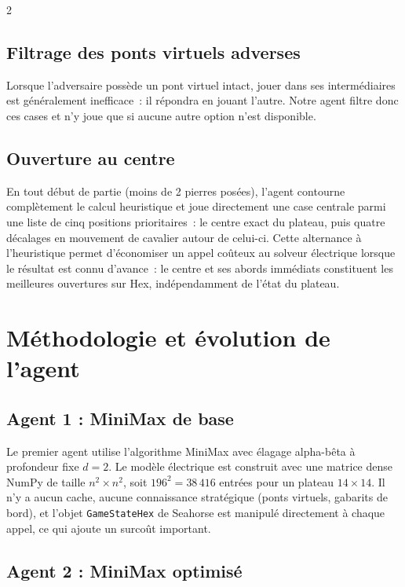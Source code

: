 \documentclass[11pt]{article}
\begin{document}
\begin{multicols}{2}
\subsection{Filtrage des ponts virtuels adverses}

Lorsque l'adversaire possède un pont virtuel intact, jouer dans ses intermédiaires est généralement inefficace~: il répondra en jouant l'autre. Notre agent filtre donc ces cases et n'y joue que si aucune autre option n'est disponible.

\subsection{Ouverture au centre}

En tout début de partie (moins de 2 pierres posées), l'agent contourne complètement le calcul heuristique et joue directement une case centrale parmi une liste de cinq positions prioritaires~: le centre exact du plateau, puis quatre décalages en mouvement de cavalier autour de celui-ci. Cette alternance à l'heuristique permet d'économiser un appel coûteux au solveur électrique lorsque le résultat est connu d'avance~: le centre et ses abords immédiats constituent les meilleures ouvertures sur Hex, indépendamment de l'état du plateau.

\section{Méthodologie et évolution de l'agent}

\subsection{Agent 1 : MiniMax de base}

Le premier agent utilise l'algorithme MiniMax avec élagage alpha-bêta à profondeur fixe $d = 2$. Le modèle électrique est construit avec une matrice dense NumPy de taille $n^2 \times n^2$, soit $196^2 = 38\,416$ entrées pour un plateau $14 \times 14$. Il n'y a aucun cache, aucune connaissance stratégique (ponts virtuels, gabarits de bord), et l'objet \texttt{GameStateHex} de Seahorse est manipulé directement à chaque appel, ce qui ajoute un surcoût important.

\subsection{Agent 2 : MiniMax optimisé}


\end{multicols}
\end{document}
